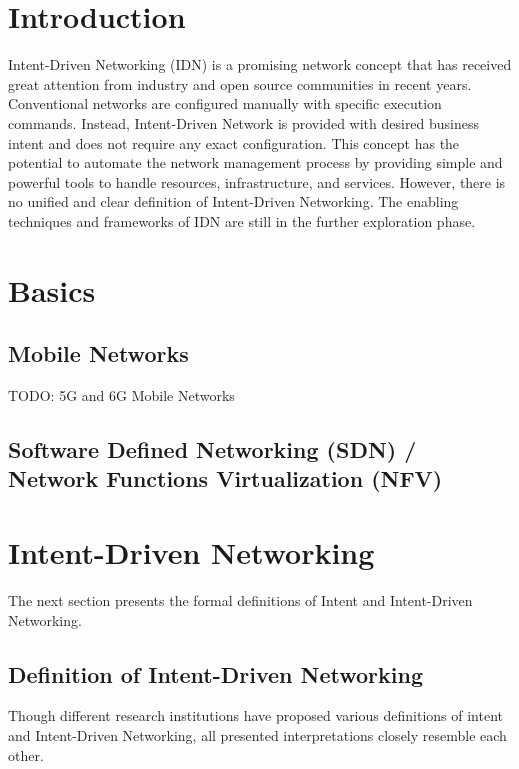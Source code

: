 




\tableofcontents

\clearpage
{}

\section{Introduction}
\label{sec:Introduction}
Intent-Driven Networking (IDN) is a promising network concept that has received great attention from industry and open source communities in recent years. Conventional networks are configured manually with specific execution commands. Instead, Intent-Driven Network is provided with desired business intent and does not require any exact configuration. This concept has the potential to automate the network management process by providing simple and powerful tools to handle resources, infrastructure, and services\cite{Mwanje2021}. However, there is no unified and clear definition of Intent-Driven Networking. The enabling techniques and frameworks of IDN are still in the further exploration phase\cite{8968429}.

\section{Basics}
\label{sec:Basics}

\subsection{Mobile Networks}
TODO: 5G and 6G Mobile Networks

\subsection{Software Defined Networking (SDN) / Network Functions Virtualization (NFV)}


\section{Intent-Driven Networking}
\label{sec:Intent_Driven_Networking}
The next section presents the formal definitions of Intent and Intent-Driven Networking. 

\subsection{Definition of Intent-Driven Networking}
Though different research institutions have proposed various definitions of intent and Intent-Driven Networking, all presented interpretations closely resemble each other. 

